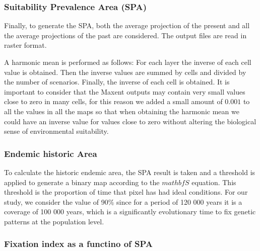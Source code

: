\documentclass[
]{article}
\begin{document}
\hypertarget{suitability-prevalence-area-spa}{%
\subsubsection{Suitability Prevalence Area
(SPA)}\label{suitability-prevalence-area-spa}}

Finally, to generate the SPA, both the average projection of the present
and all the average projections of the past are considered. The output
files are read in raster format.

A harmonic mean is performed as follows: For each layer the inverse of
each cell value is obtained. Then the inverse values are summed by cells
and divided by the number of scenarios. Finally, the inverse of each
cell is obtained. It is important to consider that the Maxent outputs
may contain very small values close to zero in many cells, for this
reason we added a small amount of \(0.001\) to all the values in all the
maps so that when obtaining the harmonic mean we could have an inverse
value for values close to zero without altering the biological sense of
environmental suitability.

\hypertarget{endemic-historic-area}{%
\subsubsection{Endemic historic Area}\label{endemic-historic-area}}

To calculate the historic endemic area, the SPA result is taken and a
threshold is applied to generate a binary map according to the
\(mathbf{S}\) equation. This threshold is the proportion of time that
pixel has had ideal conditions. For our study, we consider the value of
90\% since for a period of 120 000 years it is a coverage of 100 000
years, which is a significantly evolutionary time to fix genetic
patterns at the population level.

\hypertarget{fixation-index-as-a-functino-of-spa}{%
\subsubsection{Fixation index as a functino of
SPA}\label{fixation-index-as-a-functino-of-spa}}
\end{document}
